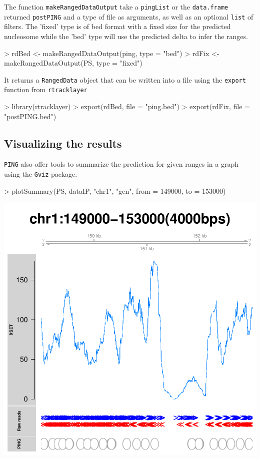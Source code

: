 \documentclass[11pt]{article}
\begin{document}
The function \texttt{makeRangedDataOutput} take a \texttt{pingList} or the
\texttt{data.frame} returned \texttt{postPING} and a type of file as arguments,
as well as an optional \texttt{list} of filters.
The 'fixed' type is of bed format with a fixed size for the predicted nucleosome
while the 'bed' type will use the predicted delta to infer the ranges.
\begin{Schunk}
\begin{Sinput}
> rdBed <- makeRangedDataOutput(ping, type = "bed")
> rdFix <- makeRangedDataOutput(PS, type = "fixed")
\end{Sinput}
\end{Schunk}

It returns a \texttt{RangedData} object that can be written into a file using
the \texttt{export} function from \texttt{rtracklayer}
\begin{Schunk}
\begin{Sinput}
> library(rtracklayer)
> export(rdBed, file = "ping.bed")
> export(rdFix, file = "postPING.bed")
\end{Sinput}
\end{Schunk}

\subsection{Visualizing the results}
\texttt{PING} also offer tools to summarize the prediction for given ranges in a
graph using the \texttt{Gviz} package.
\begin{Schunk}
\begin{Sinput}
> plotSummary(PS, dataIP, "chr1", "gen", from = 149000, to = 153000)
\end{Sinput}
\end{Schunk}
\includegraphics{PING-plotSummary}
\end{document}
